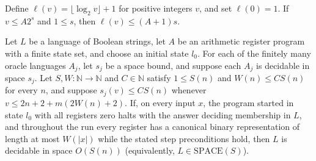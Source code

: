 \begin{lemma}
\label{Complexity.logSpace_le_of_le_mul_two_pow}
\leanok
{}
Define $\ell(v)=\lfloor\log_2 v\rfloor+1$ for positive integers $v$, and set
$\ell(0)=1$. If $v\le A2^s$ and $1\le s$, then $\ell(v)\le(A+1)s$.
\end{lemma}

\begin{theorem}
\label{Complexity.LogProg.arm_decides_space}
\leanok
{}
Let $L$ be a language of Boolean strings, let $A$ be an arithmetic register program with
a finite state set, and choose an initial state $l_0$. For each of the finitely many
oracle languages $A_j$, let $s_j$ be a space bound, and suppose each $A_j$ is decidable
in space $s_j$. Let $S,W:\mathbb{N}\to\mathbb{N}$ and $C\in\mathbb{N}$ satisfy $1\le
S(n)$ and $W(n)\le C S(n)$ for every $n$, and suppose $s_j(v)\le C S(n)$ whenever $v\le
2n+2+m(2W(n)+2)$. If, on every input $x$, the program started in state $l_0$ with all
registers zero halts with the answer deciding membership in $L$, and throughout the run
every register has a canonical binary representation of length at most $W(|x|)$ while
the stated step preconditions hold, then $L$ is decidable in space $O(S(n))$
(equivalently, $L\in\mathrm{SPACE}(S)$).
\end{theorem}

